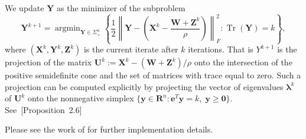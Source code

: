 \documentclass[twoside,11pt]{article}
\newcommand{\R}{\mathbf{R}}
\newcommand{\Z}{\bs{Z}}
\DeclareMathOperator*{\argmin}{\arg\min}
\DeclareMathOperator{\tr}{{Tr}}
\newcommand{\e}{\bs {e}}
\newcommand{\bs}{\boldsymbol}
\newcommand{\X}{\bs {X}}
\newcommand{\y}{\bs {y}}
\newcommand{\Y}{\bs {Y}}
\newcommand{\W}{\bs {W}}
\newcommand{\0}{\bs{0}}
\newcommand{\rbra}[1]{\ensuremath{\left( #1 \right)}} %
\newcommand{\bra}[1]{\ensuremath{\left\{ #1 \right\}}} %
\begin{document}
{We update $\Y$ as the minimizer of the subproblem
\begin{equation}\label{eq: Y subprob}
	\Y^{k+1} = \argmin_{\Y \in \Sigma^n_+} \bra{ \frac{1}{2} \left\| \Y - \rbra{ \X^k - \frac{\W + \Z^k}{\rho}}\right\|^2_F : \tr(\Y) = k},
\end{equation}
where $(\X^k, \Y^k, \Z^k)$ is the current iterate after $k$ iterations.
That is $Y^{k+1}$ is the projection of the matrix $\bs{U}^k := \X^k - (\W + \Z^k)/\rho$ onto the intersection of the positive semidefinite cone and the set of matrices with trace equal to zero.
Such a projection can be computed explicitly by projecting the vector of eigenvalues $\bs{\lambda}^k$ of $\bs{U}^k$ onto the nonnegative simplex $\{\y \in \R^n: \e^T \y = k, \; \y \ge \bs 0\}$.
See~\citet{2010}[Proposition~2.6]{} \cite{lu}






Please see the work of \citet[Section 6]{ames2014guaranteed} for further implementation details.

}
\end{document}
